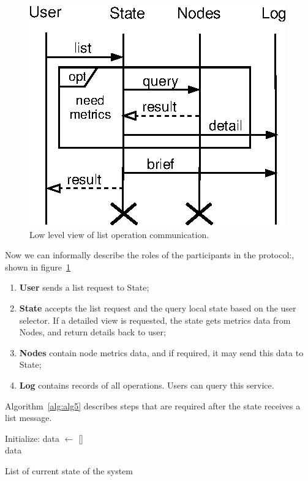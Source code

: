 \begin{figure}[!htbp]
	\begin{center}
		\includegraphics[scale=0.9]{images/FIG4}
	\end{center}
	\vspace{-0.4cm}
	\caption{Low level view of list operation communication.}
	\label{fig:fig8}
\end{figure}

\noindent
Now we can informally describe the roles of the participants in the protocol:\label{list_protocol_informal_description}, shown in figure~\ref{fig:fig8}

\begin{enumerate}[start=1,label={(\bfseries \arabic*)}]
	\item \textbf{User} sends a list request to State;
	\item \textbf{State} accepts the list request and the query local state based on the user selector. If a detailed view is requested, the state gets metrics data from Nodes, and return details back to user;
	\item \textbf{Nodes} contain node metrics data, and if required, it may send this data to State;
	\item \textbf{Log} contains records of all operations. Users can query this service.
\end{enumerate}

\noindent
Algorithm~\ref{alg:alg5} describes steps that are required after the state receives a list message.

\begin{algorithm}[H]
	\SetAlgoLined
	Initialize: data $\leftarrow$ []\\
	\Return data
	\caption{List of current state of the system}
	\label{alg:alg5}
\end{algorithm}

